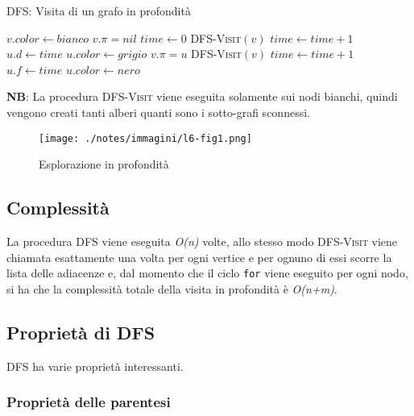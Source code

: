 \begin{breakablealgorithm}
	\caption{DFS: Visita di un grafo in profondità}
	\begin{algorithmic}[1]
				\State $v.color \gets bianco$
				\State $ v.\pi = nil $
			\EndFor
			\State $ time \gets 0 $
					\State \textsc{DFS-Visit}$ (v) $
				\EndIf
			\EndFor
		\EndFunction
		\Statex
			\State $ time \gets time + 1 $
			\State $ u.d \gets time $
			\State $ u.color \gets grigio $
					\State $ v.\pi = u $
					\State \textsc{DFS-Visit}$ (v) $  
				\EndIf
			\EndFor
			\State $ time \gets time + 1 $
		    \State $ u.f \gets time $
		    \State $ u.color \gets nero $
		\EndFunction
	\end{algorithmic}
\end{breakablealgorithm}

\textbf{NB}: La procedura \textsc{DFS-Visit} viene eseguita solamente sui nodi
bianchi, quindi vengono creati tanti alberi quanti sono i sotto-grafi
sconnessi.

\begin{figure}[htbp]
	\centering
	\texttt{[image: ./notes/immagini/l6-fig1.png]}
	\caption{Esplorazione in profondità}
\end{figure}

\subsection{Complessità}\label{complessituxe0}

La procedura \textsc{DFS} viene eseguita \emph{O(n)} volte, allo stesso
modo \textsc{DFS-Visit} viene chiamata esattamente una volta per ogni
vertice e per ognuno di essi scorre la lista delle adiacenze e, dal
momento che il ciclo \texttt{for} viene eseguito per ogni nodo, si ha che la
complessità totale della visita in profondità è \emph{O(n+m)}.

\subsection{Proprietà di DFS}\label{proprietuxe0-di-dfs}

DFS ha varie proprietà interessanti.

\subsubsection{Proprietà delle
parentesi}\label{proprietuxe0-delle-parentesi}

